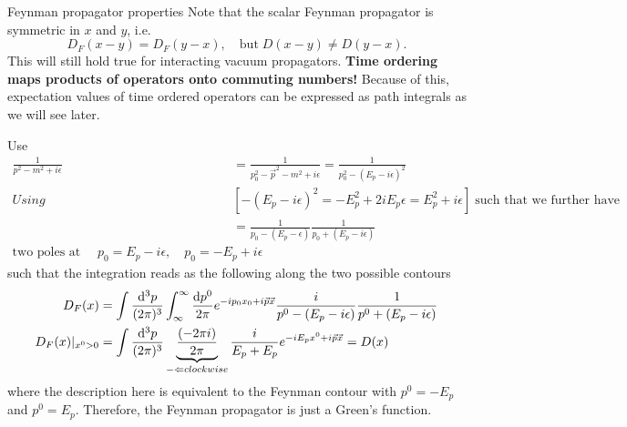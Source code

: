 \begin{mybox}{Feynman propagator properties}
Note that the scalar Feynman propagator is symmetric in $x$ and $y$, i.e.
 \begin{equation}
 D_F(x-y) = D_F(y-x), \quad \mathrm{but}\; D(x-y) \neq D(y-x).
 \end{equation}
This will still hold true for interacting vacuum propagators. \textbf{Time ordering maps products of operators onto commuting numbers!} Because of this, expectation values of time ordered operators can
be expressed as path integrals as we will see later.
\end{mybox}
Use
\begin{align*}
	\frac{1}{p^2-m^2+i\epsilon} &= \frac{1}{p^2_0 - \vec{p}^2-m^2 + i\epsilon}=\frac{1}{p^2_0 - (E_p - i\epsilon)^2}\\
	Using \; &\left[-(E_p-i\epsilon)^2 = -E^2_p+2i E_p \epsilon = E^2_p + i \epsilon\right]\; \text{such that we further have} \\
	&= \frac{1}{p_0 - (E_p - \epsilon)} \frac{1}{p_0 +(E_p-i\epsilon)} \\
	\text{two poles at }\quad p_0=E_p -i\epsilon,\quad p_0 =-E_p + i \epsilon
\end{align*}
such that the integration reads as the following along the two possible contours 
\begin{align*}
	D_F(x) &= \int \frac{\mathrm{d}^3 p}{(2 \pi)^3} \int_{\-\infty}^\infty \frac{\mathrm{d} p^0}{2 \pi} e^{-i p_0 x_0 + i \vec{p}\vec{x}} \frac{i}{p^0-(E_p-i \epsilon)} \frac{1}{p^0 + (E_p - i \epsilon)}\\
	D_F(x) |_{x^0>0} &= \int \frac{\mathrm{d}^3 p}{(2 \pi)^3} \underbrace{\frac{(-2 \pi i)}{2 \pi}}_{- \Leftarrow clockwise} \frac{i}{E_p +E_p} e^{-i E_p x^0+ i \vec{p}\vec{x}} = D(x)
\end{align*}
where the description here is equivalent to the Feynman contour with $p^0=-E_p$ and $p^0=E_p$. Therefore, the Feynman propagator is just a Green's function.
